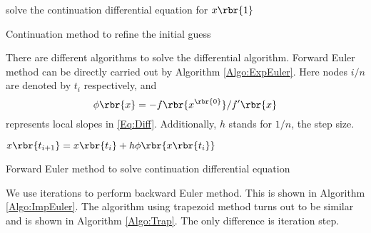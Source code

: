 \documentclass[english, nochinese]{pkupaper}
\begin{document}
\begin{algorithm}
\SetAlgoLined


\BlankLine

solve the continuation differential equation for $ x \rbr{1} $\;


\BlankLine

\caption{Continuation method to refine the initial guess}
\label{Algo:Cont}
\end{algorithm}

There are different algorithms to solve the differential algorithm. Forward Euler method can be directly carried out by Algorithm \ref{Algo:ExpEuler}. Here nodes $ i / n $ are denoted by $t_i$ respectively, and
\begin{equation}
\phi \rbr{x} = - f \rbr{x^{\rbr{0}}} / f' \rbr{x}
\end{equation}
represents local slopes in \eqref{Eq:Diff}. Additionally, $h$ stands for $ 1 / n $, the step size.

\begin{algorithm}
\SetAlgoLined


\BlankLine

{
    $ x \rbr{t_{ i + 1 }} = x \rbr{t_i} + h \phi \rbr{ x \rbr{t_i} } $\;
}


\BlankLine

\caption{Forward Euler method to solve continuation differential equation}
\label{Algo:ExpEuler}
\end{algorithm}

We use iterations to perform backward Euler method. This is shown in Algorithm \ref{Algo:ImpEuler}. The algorithm using trapezoid method turns out to be similar and is shown in Algorithm \ref{Algo:Trap}. The only difference is iteration step.
\end{document}
